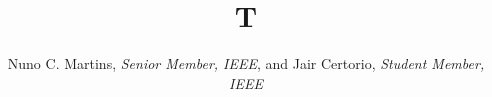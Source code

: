 \documentclass[journal]{IEEEtran}
\def\IEEEmembership#1{\textit{#1}}
\begin{document}
\title{T}
\author{Nuno C. Martins, \IEEEmembership{Senior Member, IEEE}, and Jair Certorio, \IEEEmembership{Student Member, IEEE}}
\maketitle
\end{document}
